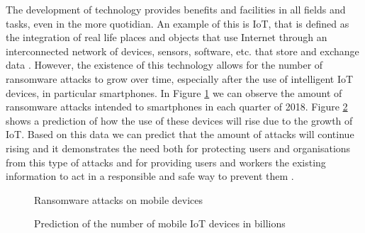 The development of technology provides benefits and facilities in all fields and tasks, even in the more quotidian. An example of this is \gls{IoT}, that is defined as the integration of real life places and objects that use Internet through an interconnected network of devices, sensors, software, etc. that store and exchange data \cite{IoTDEF}. However, the existence of this technology allows for the number of ransomware attacks to grow over time, especially after the use of intelligent \gls{IoT} devices, in particular smartphones. In Figure \ref{fig:im1} we can observe the amount of ransomware attacks intended to smartphones in each quarter of 2018. Figure \ref{fig:im2} shows a prediction of how the use of these devices will rise due to the growth of \gls{IoT}. Based on this data we can predict that the amount of attacks will continue rising and it demonstrates the need both for protecting users and organisations from this type of attacks and for providing users and workers the existing information to act in a responsible and safe way to prevent them \cite{HUMAYUN2021105}.

\begin{figure}[htb]
\begin{center}
{}
\end{center}
\caption{Ransomware attacks on mobile devices}
\label{fig:im1}
\end{figure}


\begin{figure}[htb]
\begin{center}
{}
\end{center}
\caption{Prediction of the number of mobile IoT devices in billions}
\label{fig:im2}
\end{figure}


